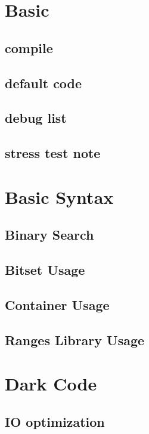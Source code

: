 \section{Basic}

\subsection{compile}

\subsection{default code}

\subsection{debug list}

\subsection{stress test note}


\section{Basic Syntax}
\subsection{Binary Search}

\subsection{Bitset Usage}

\subsection{Container Usage}

\subsection{Ranges Library Usage}



\section{Dark Code}

\subsection{IO optimization}

